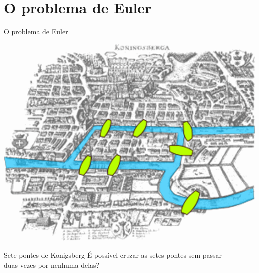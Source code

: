 \documentclass[xcolor=dvipsnames,table]{beamer}
\begin{document}
	\section{O problema de Euler}
	\begin{frame}[shrink]{O problema de Euler}
		\begin{center}
    		\includegraphics[height=.6\textheight]{images/konigsberg.png}
  		\end{center} \pause
		\begin{alertblock}{Sete pontes de Konigsberg} \pause
			É possível cruzar as setes pontes sem passar \\
			duas vezes por nenhuma delas?
		\end{alertblock}
	\end{frame}
	
\end{document}
